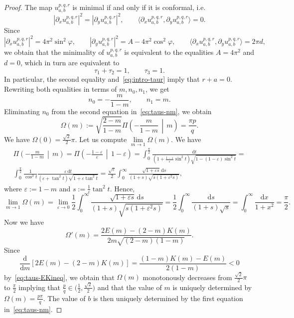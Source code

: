 \documentclass{amsart}
\let\epsilon\varepsilon
\let\phi\varphi
\renewcommand{\d}{\mathrm{d}}
\newcommand{\bigmid}{\,\middle\vert\,}
\theoremstyle{plain}
\theoremstyle{definition}
\theoremstyle{remark}
\begin{document}
\begin{proof}
The map \(u_{a,b}^{p,q,r}\) is minimal if and only if it is conformal, i.e.
\[
|\partial_x u_{a,b}^{p,q,r}|^2=|\partial_y u_{a,b}^{p,q,r}|^2,\qquad
\langle\partial_x u_{a,b}^{p,q,r},\partial_y u_{a,b}^{p,q,r}\rangle=0.
\]
Since
\begin{equation}\label{eq:otsuki-hopf}
|\partial_x u_{a,b}^{p,q,r}|^2=4\pi^2\sin^2\phi,\qquad
|\partial_y u_{a,b}^{p,q,r}|^2=A-4\pi^2\cos^2\phi,\qquad
\langle\partial_x u_{a,b}^{p,q,r},\partial_y
u_{a,b}^{p,q,r}\rangle=2\pi d,
\end{equation}
we obtain that the minimality of \(u_{a,b}^{p,q,r}\) is equivalent to the
equalities \(A=4\pi^2\) and \(d=0\), which in turn are equivalent to
\[
\tau_1+\tau_2=1,\qquad\tau_3=1.
\]
In particular, the second equality and~\eqref{eq:intro-taur} imply that
\(r+a=0\). Rewriting both equalities in terms of \(m,n_0,n_1\), we get
\[
n_0=-\frac{m}{1-m},\qquad n_1=m. 
\]
Eliminating \(n_0\) from the second equation in~\eqref{eq:taus-nm}, we obtain
\[
\Omega(m):=\sqrt{\frac{2-m}{1-m}}\Pi\left(-\frac{m}{1-m}\bigmid m\right)=
\frac{\pi p}q.
\]
We have \(\Omega(0)=\frac{\sqrt 2}2\pi\). Let us compute \(\lim\limits_{m\to
1}\Omega(m)\). We have
\begin{multline*}
\Pi\left(-\frac{m}{1-m}\bigmid m\right)
=\Pi\left(-\frac{1-\epsilon}\epsilon\bigmid 1-\epsilon\right)
=\int_0^{\frac{\pi}2}\frac{\d t}
{\left(1+\frac{1-\epsilon}\epsilon\sin^2 t\right)
\sqrt{1-(1-\epsilon)\sin^2 t}}=\\
\int_0^{\frac{\pi}2}\frac{1}{\cos^3 t}
\frac{\epsilon\,\d t}{(\epsilon+\tan^2 t)\sqrt{1+\epsilon\tan^2 t}}
=\frac{\sqrt\epsilon}2\int_0^\infty\frac{\sqrt{1+\epsilon s}\,\d s}
{(1+s)\sqrt{s(1+\epsilon^2 s)}},
\end{multline*}
where \(\epsilon:=1-m\) and \(s:=\frac{1}\epsilon\tan^2 t\). Hence,
\[
\lim_{m\to 1}\Omega(m)=\lim_{\epsilon\to 0}
\frac{1}2\int_0^\infty\frac{\sqrt{1+\epsilon s}\,\d s}
{(1+s)\sqrt{s(1+\epsilon^2 s)}}=
\frac{1}2\int_0^\infty\frac{\d s}{(1+s)\sqrt s}=
\int_0^\infty\frac{\d x}{1+x^2}=\frac{\pi}2.
\]
Now we have
\[
\Omega'(m)=\frac{2E(m)-(2-m)K(m)}{2m\sqrt{(2-m)(1-m)}}.
\]
Since
\[
\frac{\d}{\d m}[2E(m)-(2-m)K(m)]=\frac{(1-m)K(m)-E(m)}{2(1-m)}<0
\]
by~\eqref{eq:taus-EKineq}, we obtain that \(\Omega(m)\) monotonously decreases
from \(\frac{\sqrt 2}2\pi\) to \(\frac{\pi}2\) implying that
\(\frac{p}q\in\bigl(\frac{1}2,\frac{\sqrt 2}2\bigr)\) and that the value of
\(m\) is uniquely determined by \(\Omega(m)=\frac{p\pi}q\). The value of
\(b\) is then uniquely determined by the first equation in~\eqref{eq:taus-nm}.

\end{proof}
\end{document}
